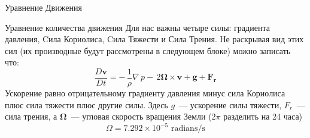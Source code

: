 \begin{chapter}{Уравнение Движения}
\begin{section}{Уравнение количества движения}
Для нас важны четыре силы: градиента давления, Cила Кориолиса, Cила
Тяжести и Сила Трения. Не раскрывая вид этих сил (их производные будут
рассмотрены в следующем блоке) можно записать что:
\begin{equation}
\frac{D\mathbf{v}}{Dt} = -\,\frac{1}{\rho}\nabla\,p -
\,2\boldsymbol{\Omega}
\times \mathbf{v} + \mathbf{g} + \mathbf{F_r}
\end{equation}
Ускорение равно отрицательному градиенту давления минус сила Кориолиса
плюс сила тяжести плюс другие силы. Здесь $g$~--- ускорение силы
тяжести, $F_r$~--- сила трения, а $\boldsymbol{\Omega}$~--- угловая
скорость вращения Земли ($2\pi$ разделить на 24 часа)
\begin{equation}
\boxed{\Omega = 7.292 \times 10^{-5} \text{ radians/s}}
\end{equation}
%


\end{section}
\end{chapter}
